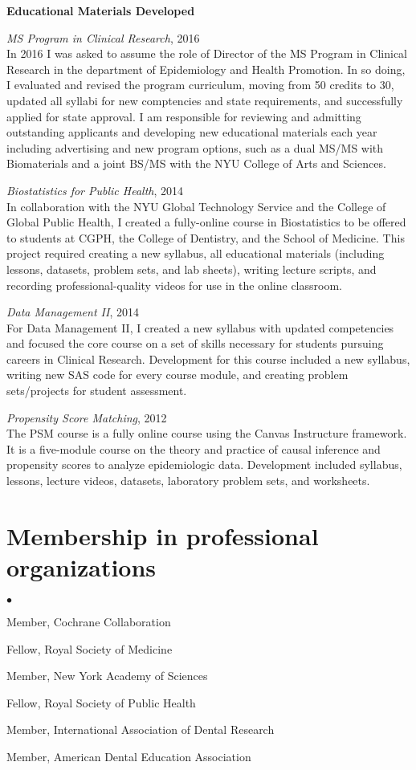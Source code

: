 \documentclass[margin,line]{res}
\newenvironment{list2}{
  \begin{list}{$\bullet$}{%
      \setlength{\itemsep}{0in}
      \setlength{\parsep}{0in} \setlength{\parskip}{0in}
      \setlength{\topsep}{0in} \setlength{\partopsep}{0in} 
      \setlength{\leftmargin}{0.2in}}}{\end{list}}
\begin{document}
\begin{resume}
{\bf Educational Materials Developed} \hfill 

\vspace*{-2.5mm}

{\em MS Program in Clinical Research}, 2016 \\
In 2016 I was asked to assume the role of Director of the MS Program in Clinical Research in the department of Epidemiology and Health Promotion. In so doing, I evaluated and revised the program curriculum, moving from 50 credits to 30, updated all syllabi for new comptencies and state requirements, and successfully applied for state approval. I am responsible for reviewing and admitting outstanding applicants and developing new educational materials each year including advertising and new program options, such as a dual MS/MS with Biomaterials and a joint BS/MS with the NYU College of Arts and Sciences.

{\em Biostatistics for Public Health}, 2014 \\
In collaboration with the NYU Global Technology Service and the College of Global Public Health, I created a fully-online course in Biostatistics to be offered to students at CGPH, the College of Dentistry, and the School of Medicine. This project required creating a new syllabus, all educational materials (including lessons, datasets, problem sets, and lab sheets), writing lecture scripts, and recording professional-quality videos for use in the online classroom. 

{\em Data Management II}, 2014 \\
For Data Management II, I created a new syllabus with updated competencies and focused the core course on a set of skills necessary for students pursuing careers in Clinical Research. Development for this course included a new syllabus, writing new SAS code for every course module, and creating problem sets/projects for student assessment. 

{\em Propensity Score Matching}, 2012	\\
The PSM course is a fully online course using the Canvas Instructure framework. It is a five-module course on the theory and practice of causal inference and propensity scores to analyze epidemiologic data. Development included syllabus, lessons, lecture videos, datasets, laboratory problem sets, and worksheets. 


\section{\sc Membership in professional organizations} 
\begin{list2}
\item Member, Cochrane Collaboration
\item Fellow, Royal Society of Medicine
\item Member, New York Academy of Sciences
\item Fellow, Royal Society of Public Health
\item Member, International Association of Dental Research
\item Member, American Dental Education Association
\end{list2}



\end{resume}
\end{document}
